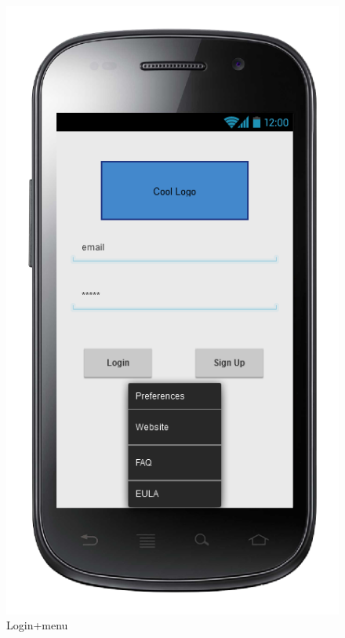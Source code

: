\begin{figure} [h]
\centering
  	  \includegraphics[scale=0.5]{ui/Login + menu.png}
\caption{Login+menu}
   
	\end{figure}

